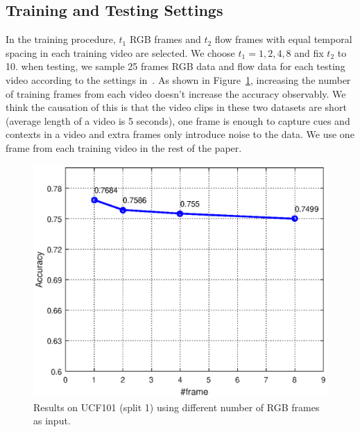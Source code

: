 \documentclass[10pt,twocolumn,letterpaper]{article}
\begin{document}
\subsection{Training and Testing Settings}
In the training procedure, $t_{1}$ RGB frames and $t_{2}$ flow frames with equal temporal spacing in each training video are selected. We choose $t_{1}={1,2,4,8}$ and fix $t_{2}$ to 10. when testing, we sample 25 frames RGB data and flow data for each testing video according to the settings in~\cite{simonyan2014two}. As shown in Figure~\ref{num_frames_accu}, increasing the number of training frames from each video doesn't increase the accuracy observably. We think the causation of this is that the video clips in these two datasets are short (average length of a video is 5 seconds), one frame is enough to capture cues and contexts in a video and extra frames only introduce noise to the data. We use one frame from each training video in the rest of the paper. 
\begin{figure}
	\begin{center}
		\includegraphics[scale=0.5]{imgs/num_frames_accu.eps}
		\caption{Results on UCF101 (split 1) using different number of RGB frames as input.}
		\label{num_frames_accu}
	\end{center}
\end{figure}
\end{document}

